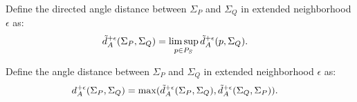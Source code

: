 Define the directed angle distance between $\Sigma_P$ and $\Sigma_Q$
in extended neighborhood $\epsilon$ as:
\begin{align*}
\tilde{d}_A^{+\epsilon}(\Sigma_P,\Sigma_Q) & = \limsup_{p \in P_S} \tilde{d}_A^{+\epsilon}(p,\Sigma_Q).
\end{align*}

Define the angle distance between $\Sigma_P$ and $\Sigma_Q$
in extended neighborhood $\epsilon$ as:
\begin{align*}
d_A^{+\epsilon}(\Sigma_P,\Sigma_Q) & = 
\max(\tilde{d}_A^{+\epsilon}(\Sigma_P,\Sigma_Q), \tilde{d}_A^{+\epsilon}(\Sigma_Q,\Sigma_P)).
\end{align*}



